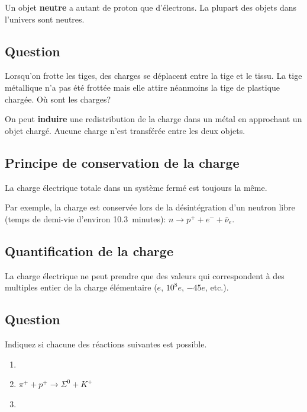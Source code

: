 Un objet \textbf{neutre} a autant de proton que d'électrons. La plupart des
objets dans l'univers sont neutres.


\subsection*{Question}


Lorsqu'on frotte les tiges, des charges se déplacent entre
la tige et le tissu. La tige métallique n'a pas été frottée mais elle attire
néanmoins la tige de plastique chargée. Où sont les charges?

On peut \textbf{induire} une redistribution de la charge dans un métal en
approchant un objet chargé. Aucune charge n'est transférée entre les deux
objets.

\subsection*{Principe de conservation de la charge}  %


La charge électrique totale dans un système fermé est toujours la même.

Par exemple, la charge est conservée lors de la désintégration d'un neutron
libre (temps de demi-vie d'environ \SI{10.3}{minutes}): $n \rightarrow p^+ +
e^- + \bar{\nu}_e$.



\subsection*{Quantification de la charge}

La charge électrique ne peut prendre que des valeurs qui correspondent à des
multiples entier de la charge élémentaire ($e$, $10^{8}e$, $-45e$, etc.).


\subsection*{Question}

Indiquez si chacune des réactions suivantes est possible.
  \begin{enumerate}
    \item {}
    \item $\pi^+ + p^+ \longrightarrow \Sigma^0 + K^+$
    \item {}
  \end{enumerate}


